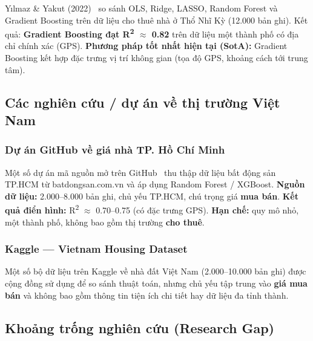 Yılmaz \& Yakut (2022)~\cite{yilmaz2022rental} so sánh OLS, Ridge, LASSO, Random Forest và
Gradient Boosting trên dữ liệu cho thuê nhà ở Thổ Nhĩ Kỳ (12.000 bản ghi).
Kết quả: \textbf{Gradient Boosting đạt R\textsuperscript{2} $\approx$ 0.82} trên dữ liệu
một thành phố có địa chỉ chính xác (GPS).
\textbf{Phương pháp tốt nhất hiện tại (SotA):} Gradient Boosting kết hợp
đặc trưng vị trí không gian (tọa độ GPS, khoảng cách tới trung tâm).

\subsection{Các nghiên cứu / dự án về thị trường Việt Nam}

\subsubsection*{Dự án GitHub về giá nhà TP. Hồ Chí Minh}

Một số dự án mã nguồn mở trên GitHub~\cite{github_hcm_housing} thu thập dữ liệu bất động sản
TP.HCM từ batdongsan.com.vn và áp dụng Random Forest / XGBoost.
\textbf{Nguồn dữ liệu:} 2.000--8.000 bản ghi, chủ yếu TP.HCM, chú trọng giá \textbf{mua bán}.
\textbf{Kết quả điển hình:} R\textsuperscript{2} $\approx$ 0.70--0.75 (có đặc trưng GPS).
\textbf{Hạn chế:} quy mô nhỏ, một thành phố, không bao gồm thị trường \textbf{cho thuê}.

\subsubsection*{Kaggle — Vietnam Housing Dataset}

Một số bộ dữ liệu trên Kaggle về nhà đất Việt Nam (2.000--10.000 bản ghi) được cộng đồng
sử dụng để so sánh thuật toán, nhưng chủ yếu tập trung vào \textbf{giá mua bán}
và không bao gồm thông tin tiện ích chi tiết hay dữ liệu đa tỉnh thành.

\subsection{Khoảng trống nghiên cứu (Research Gap)}

